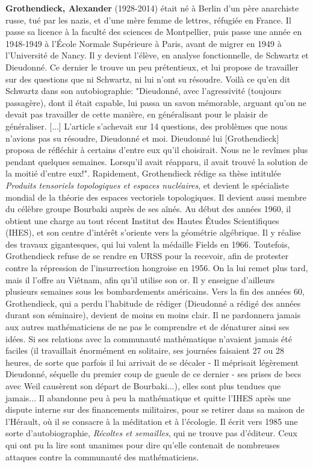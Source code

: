 \textbf{Grothendieck, Alexander} (1928-2014) était né à Berlin d'un père anarchiste russe, tué par les nazis, et d'une mère femme de lettres, réfugiée en France. Il passe sa licence à la faculté des sciences de Montpellier, puis passe une année en 1948-1949 à l'École Normale Supérieure à Paris, avant de migrer en 1949 à l'Université de Nancy. Il y devient l'élève, en analyse fonctionnelle, de Schwartz et Dieudonné. Ce dernier le trouve un peu prétentieux, et lui propose de travailler sur des questions que ni Schwartz, ni lui n'ont su résoudre. Voilà ce qu'en dit Schwartz dans son autobiographie: "Dieudonné, avec l'agressivité (toujours passagère), dont il était capable, lui passa un savon mémorable, arguant qu'on ne devait pas travailler de cette manière, en généralisant pour le plaisir de généraliser. [...] L'article s'achevait sur 14 questions, des problèmes que nous n'avions pas su résoudre, Dieudonné et moi. Dieudonné lui [Grothendieck] proposa de réfléchir à certains d'entre eux qu'il choisirait. Nous ne le revîmes plus pendant quelques semaines. Lorsqu'il avait réapparu, il avait trouvé la solution de la moitié d'entre eux!".  Rapidement, Grothendieck rédige sa thèse intitulée \textit{Produits tensoriels topologiques et espaces nucléaires}, et devient le spécialiste mondial de la théorie des espaces vectoriels topologiques. Il devient aussi membre du célèbre groupe Bourbaki auprès de ses aînés.  Au début des années 1960, il obtient une charge au tout récent Institut des Hautes Études Scientifiques (IHES), et son centre d'intérêt s'oriente vers la géométrie algébrique. Il y réalise des travaux gigantesques, qui lui valent la médaille Fields en 1966. Toutefois, Grothendieck refuse de se rendre en URSS pour la recevoir, afin de protester contre la répression de l'insurrection hongroise en 1956. On la lui remet plus tard, mais il l'offre au Viêtnam, afin qu'il utilise son or. Il y enseigne d'ailleurs plusieurs semaines sous les bombardements américains. Vers la fin des années 60, Grothendieck, qui a perdu l'habitude de rédiger (Dieudonné a rédigé des années durant son séminaire), devient de moins en moins clair. Il ne pardonnera jamais aux autres mathématiciens de ne pas le comprendre et de dénaturer ainsi ses idées. Si ses relations avec la communauté mathématique n'avaient jamais été faciles (il travaillait énormément en solitaire, ses journées faisaient 27 ou 28 heures, de sorte que parfois il lui arrivait de se décaler - Il méprisait légèrement Dieudonné, séquelle du premier coup de gueule de ce dernier - ses prises de becs avec Weil causèrent son départ de Bourbaki...), elles sont plus tendues que jamais... Il abandonne peu à peu la mathématique et quitte l'IHES après une dispute interne sur des financements militaires, pour se retirer dans sa maison de l'Hérault, où il se consacre à la méditation et à l'écologie. Il écrit vers 1985 une sorte d'autobiographie, \textit{Récoltes et semailles}, qui ne trouve pas d'éditeur. Ceux qui ont pu la lire sont unanimes pour dire qu'elle contenait de nombreuses attaques contre la communauté des mathématiciens.

